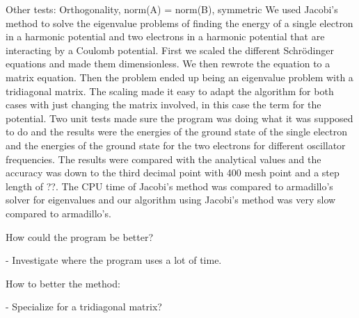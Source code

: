 Other tests: Orthogonality, norm(A) = norm(B), symmetric
We used Jacobi's method to solve the eigenvalue problems of finding the energy of a single electron in a harmonic potential and two electrons in a harmonic potential that are interacting by a Coulomb potential. First we scaled the different Schrödinger equations and made them dimensionless. We then rewrote the equation to a matrix equation. Then the problem ended up being an eigenvalue problem with a tridiagonal matrix. The scaling made it easy to adapt the algorithm for both cases  with just changing the matrix involved, in this case the term for the potential. Two unit tests made sure the program was doing what it was supposed to do and the results were the energies of the ground state of the single electron and the energies of the ground state for the two electrons for different oscillator frequencies. The results were compared with the analytical values and the accuracy was down to the third decimal point with 400 mesh point and a step length of ??. The CPU time of Jacobi's method was compared to armadillo's solver for eigenvalues and our algorithm using Jacobi's method was very slow compared to armadillo's. 

How could the program be better?

- Investigate where the program uses a lot of time.

How to better the method:

- Specialize for a tridiagonal matrix?



